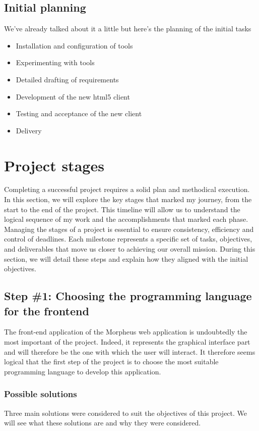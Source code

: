 \documentclass[a4paper, 12pt, french]{article}
\newcommand{\bdot}{\item[\color{ssiYellow}\ding{108}]}
\begin{document}
				\subsection{Initial planning}
					\noindent We've already talked about it a little but here's the planning of the initial tasks
					\begin{itemize}
						\bdot{Installation and configuration of tools}
						\bdot{Experimenting with tools}
						\bdot{Detailed drafting of requirements}
						\bdot{Development of the new \gls{html}5 client}
						\bdot{Testing and acceptance of the new client}
						\bdot{Delivery}
					\end{itemize}
						
			\section{Project stages}
				Completing a successful project requires a solid plan and methodical execution. In this section, we will explore the key stages that marked my journey, from the start to the end of the project. This timeline will allow us to understand the logical sequence of my work and the accomplishments that marked each phase.\\

				Managing the stages of a project is essential to ensure consistency, efficiency and control of deadlines. Each milestone represents a specific set of tasks, objectives, and deliverables that move us closer to achieving our overall mission. During this section, we will detail these steps and explain how they aligned with the initial objectives.

				\subsection{Step \#1: Choosing the programming language for the \gls{frontend}}
					The front-end application of the Morpheus web application is undoubtedly the most important of the project. Indeed, it represents the graphical interface part and will therefore be the one with which the user will interact. It therefore seems logical that the first step of the project is to choose the most suitable programming language to develop this application.
	
					\subsubsection{Possible solutions}
						Three main solutions were considered to suit the objectives of this project. We will see what these solutions are and why they were considered.
						
\end{document}
